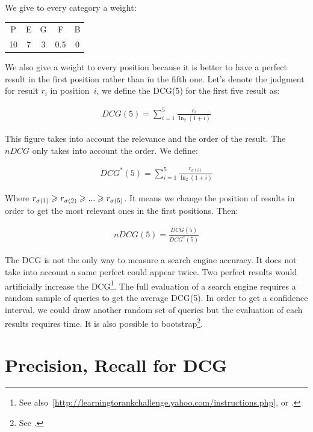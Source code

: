 We give to every category a weight:

\begin{center}\begin{tabular}{ccccc}
P & E & G & F & B \\
10 & 7 & 3 & 0.5 & 0
\end{tabular}\end{center}

We also give a weight to every position because it is better to have a perfect result in the first position rather than in the fifth one. Let's denote the judgment for result $r_i$ in position~$i$, we define the DCG(5) for the first five result as:

\begin{eqnarray}
DCG(5) = \sum_{i=1}^{5} \frac{ r_i } { \ln_2 (1+i) }
\end{eqnarray}

This figure takes into account the relevance and the order of the result. The $nDCG$ only takes into account the order. We define:

\begin{eqnarray}
DCG^*(5) = \sum_{i=1}^{5} \frac{ r_{\sigma(i)} } {\ln_2 (1+i) }
\end{eqnarray}

Where $r_{\sigma(1)} \geqslant r_{\sigma(2)} \geqslant ... \geqslant r_{\sigma(5)}$. It means we change the position of results in order to get the most relevant ones in the first positions. Then: 

\begin{eqnarray}
nDCG(5) =  \frac{ DCG(5) } { DCG^*(5) }
\end{eqnarray}

The DCG is not the only way to measure a search engine accuracy. It does not take into account a same perfect could appear twice. Two perfect results would artificially increase the DCG\footnote{See also~\ref{http://learningtorankchallenge.yahoo.com/instructions.php}, or .}. The full evaluation of a search engine requires a random sample of queries to get the average DCG(5). In order to get a confidence interval, we could draw another random set of queries but the evaluation of each results requires time. It is also possible to bootstrap\footnote{See .}.


\section{Precision, Recall for DCG}


